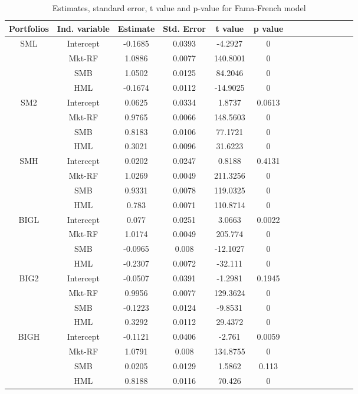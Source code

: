 \documentclass[11pt]{article}
\begin{document}
\begin{table}
\centering
\begin{tabular}{cccccccccccccc}
 \hline
 Portfolios&Ind. variable& Estimate & Std. Error & t value & p value \\ 
  \hline
SML & Intercept & -0.1685 & 0.0393 & -4.2927 & 0 \\ 
   & Mkt-RF & 1.0886 & 0.0077 & 140.8001 & 0 \\ 
   & SMB & 1.0502 & 0.0125 & 84.2046 & 0 \\ 
   & HML & -0.1674 & 0.0112 & -14.9025 & 0 \\ 
  SM2 & Intercept & 0.0625 & 0.0334 & 1.8737 & 0.0613 \\ 
   & Mkt-RF & 0.9765 & 0.0066 & 148.5603 & 0 \\ 
   & SMB & 0.8183 & 0.0106 & 77.1721 & 0 \\ 
   & HML & 0.3021 & 0.0096 & 31.6223 & 0 \\ 
  SMH & Intercept & 0.0202 & 0.0247 & 0.8188 & 0.4131 \\ 
   & Mkt-RF & 1.0269 & 0.0049 & 211.3256 & 0 \\ 
   & SMB & 0.9331 & 0.0078 & 119.0325 & 0 \\ 
   & HML & 0.783 & 0.0071 & 110.8714 & 0 \\ 
  BIGL & Intercept & 0.077 & 0.0251 & 3.0663 & 0.0022 \\ 
   & Mkt-RF & 1.0174 & 0.0049 & 205.774 & 0 \\ 
   & SMB & -0.0965 & 0.008 & -12.1027 & 0 \\ 
   & HML & -0.2307 & 0.0072 & -32.111 & 0 \\ 
  BIG2 & Intercept & -0.0507 & 0.0391 & -1.2981 & 0.1945 \\ 
   & Mkt-RF & 0.9956 & 0.0077 & 129.3624 & 0 \\ 
   & SMB & -0.1223 & 0.0124 & -9.8531 & 0 \\ 
   & HML & 0.3292 & 0.0112 & 29.4372 & 0 \\ 
  BIGH & Intercept & -0.1121 & 0.0406 & -2.761 & 0.0059 \\ 
   & Mkt-RF & 1.0791 & 0.008 & 134.8755 & 0 \\ 
   & SMB & 0.0205 & 0.0129 & 1.5862 & 0.113 \\ 
   & HML & 0.8188 & 0.0116 & 70.426 & 0 \\ 
   \hline
\end{tabular}

\caption{ Estimates, standard error, t value and p-value for Fama-French model}\label{tab4}
\end{table}
\end{document}
